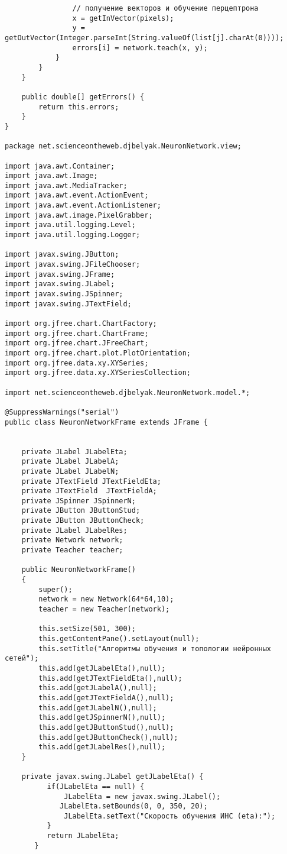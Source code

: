 \begin{verbatim}
                // получение векторов и обучение перцептрона
                x = getInVector(pixels);
                y = getOutVector(Integer.parseInt(String.valueOf(list[j].charAt(0))));
                errors[i] = network.teach(x, y);
            }
        }
	}

	public double[] getErrors() {
		return this.errors;
	}
}

package net.scienceontheweb.djbelyak.NeuronNetwork.view;

import java.awt.Container;
import java.awt.Image;
import java.awt.MediaTracker;
import java.awt.event.ActionEvent;
import java.awt.event.ActionListener;
import java.awt.image.PixelGrabber;
import java.util.logging.Level;
import java.util.logging.Logger;

import javax.swing.JButton;
import javax.swing.JFileChooser;
import javax.swing.JFrame;
import javax.swing.JLabel;
import javax.swing.JSpinner;
import javax.swing.JTextField;

import org.jfree.chart.ChartFactory;
import org.jfree.chart.ChartFrame;
import org.jfree.chart.JFreeChart;
import org.jfree.chart.plot.PlotOrientation;
import org.jfree.data.xy.XYSeries;
import org.jfree.data.xy.XYSeriesCollection;

import net.scienceontheweb.djbelyak.NeuronNetwork.model.*;

@SuppressWarnings("serial")
public class NeuronNetworkFrame extends JFrame {


	private JLabel JLabelEta;
	private JLabel JLabelA;
	private JLabel JLabelN;
	private JTextField JTextFieldEta;
	private JTextField  JTextFieldA;
	private JSpinner JSpinnerN;
	private JButton JButtonStud;
	private JButton JButtonCheck;
	private JLabel JLabelRes;
	private Network network;
	private Teacher teacher;

	public NeuronNetworkFrame()
	{
		super();
		network = new Network(64*64,10);
		teacher = new Teacher(network);
		
	    this.setSize(501, 300);
	    this.getContentPane().setLayout(null);
	    this.setTitle("Алгоритмы обучения и топологии нейронных сетей");
	    this.add(getJLabelEta(),null);
	    this.add(getJTextFieldEta(),null);
	    this.add(getJLabelA(),null);
	    this.add(getJTextFieldA(),null);
	    this.add(getJLabelN(),null);
	    this.add(getJSpinnerN(),null);
	    this.add(getJButtonStud(),null);
	    this.add(getJButtonCheck(),null);
	    this.add(getJLabelRes(),null);
	}
	
	private javax.swing.JLabel getJLabelEta() {
	      if(JLabelEta == null) {
	    	  JLabelEta = new javax.swing.JLabel();
	         JLabelEta.setBounds(0, 0, 350, 20);
	    	  JLabelEta.setText("Скорость обучения ИНС (eta):");
	      }
	      return JLabelEta;
	   }
	

\end{verbatim}
